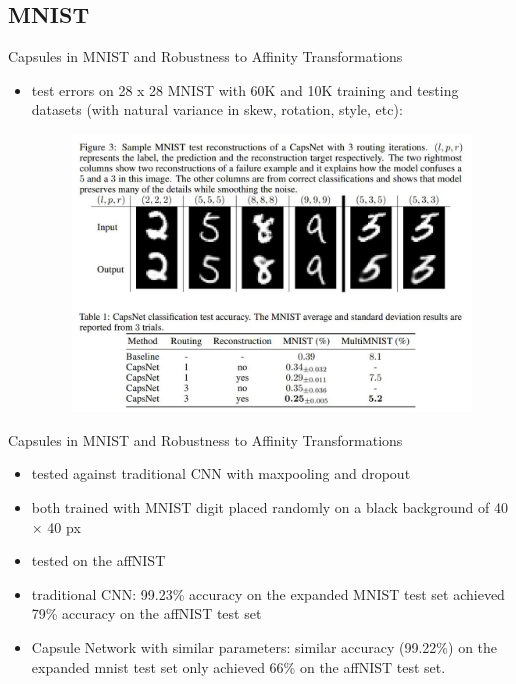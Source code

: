 \documentclass{beamer}
\begin{document}
\subsection{MNIST}
\begin{frame}{Capsules in MNIST and Robustness to Affinity Transformations}
    \begin{itemize}
    \item test errors on 28 x 28 MNIST with 60K and 10K training and testing datasets (with natural variance in skew, rotation, style, etc):
        \begin{figure}
            \centering
            \includegraphics[scale=0.5]{mnist_results.JPG}
        \end{figure}
    
    \end{itemize}
\end{frame}

\begin{frame}{Capsules in MNIST and Robustness to Affinity Transformations}
    \begin{itemize}
        \item tested against traditional CNN with maxpooling and dropout
        \item both trained with MNIST digit placed randomly on a black background of 40 × 40 px
        \item tested on the affNIST
        \item traditional CNN: 99.23\% accuracy on the expanded MNIST test set achieved 79\% accuracy on the affNIST test set
        \item Capsule Network with similar parameters: similar accuracy (99.22\%) on the expanded mnist test set only achieved 66\% on the affNIST test set.
    \end{itemize}
\end{frame}
\end{document}
